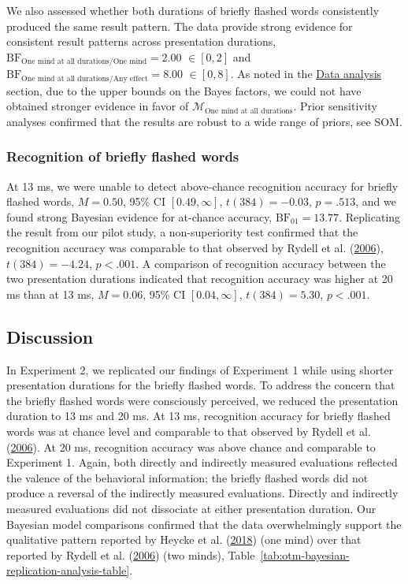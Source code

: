 \documentclass[
  man,floatsintext]{apa6}
\begin{document}
We also assessed whether both durations of briefly flashed words consistently produced the same result pattern.
The data provide strong evidence for consistent result patterns across presentation durations, \(\mathrm{BF}_{\textrm{One mind at all durations}/\textrm{One mind}} = 2.00\) \(\in [0, 2]\) and \(\mathrm{BF}_{\textrm{One mind at all durations}/\textrm{Any effect}} = 8.00\) \(\in [0, 8]\).
As noted in the \protect\hyperlink{data-analysis1}{Data analysis} section, due to the upper bounds on the Bayes factors, we could not have obtained stronger evidence in favor of \(\mathcal{M}_\textrm{One mind at all durations}\).
Prior sensitivity analyses confirmed that the results are robust to a wide range of priors, see SOM.

\hypertarget{recognition-of-briefly-flashed-words-1}{%
\subsubsection{Recognition of briefly flashed words}\label{recognition-of-briefly-flashed-words-1}}

At 13 ms, we were unable to detect above-chance recognition accuracy for briefly flashed words, \(M = 0.50\), 95\% CI \([0.49, \infty]\), \(t(384) = -0.03\), \(p = .513\), and we found strong Bayesian evidence for at-chance accuracy, \(\mathrm{BF}_{\textrm{01}} = 13.77\).
Replicating the result from our pilot study, a non-superiority test confirmed that the recognition accuracy was comparable to that observed by Rydell et al. (\protect\hyperlink{ref-rydell_two_2006}{2006}), \(t(384) = -4.24\), \(p < .001\).
A comparison of recognition accuracy between the two presentation durations indicated that recognition accuracy was higher at 20 ms than at 13 ms, \(M = 0.06\), 95\% CI \([0.04, \infty]\), \(t(384) = 5.30\), \(p < .001\).

\hypertarget{discussion-1}{%
\subsection{Discussion}\label{discussion-1}}

In Experiment 2, we replicated our findings of Experiment 1 while using shorter presentation durations for the briefly flashed words.
To address the concern that the briefly flashed words were consciously perceived, we reduced the presentation duration to 13 ms and 20 ms.
At 13 ms, recognition accuracy for briefly flashed words was at chance level and comparable to that observed by Rydell et al. (\protect\hyperlink{ref-rydell_two_2006}{2006}).
At 20 ms, recognition accuracy was above chance and comparable to Experiment 1.
Again, both directly and indirectly measured evaluations reflected the valence of the behavioral information; the briefly flashed words did not produce a reversal of the indirectly measured evaluations.
Directly and indirectly measured evaluations did not dissociate at either presentation duration.
Our Bayesian model comparisons confirmed that the data overwhelmingly support the qualitative pattern reported by Heycke et al. (\protect\hyperlink{ref-heycke_two_2018}{2018}) (one mind) over that reported by Rydell et al. (\protect\hyperlink{ref-rydell_two_2006}{2006}) (two minds), Table~\ref{tab:otm-bayesian-replication-analysis-table}.
\end{document}
